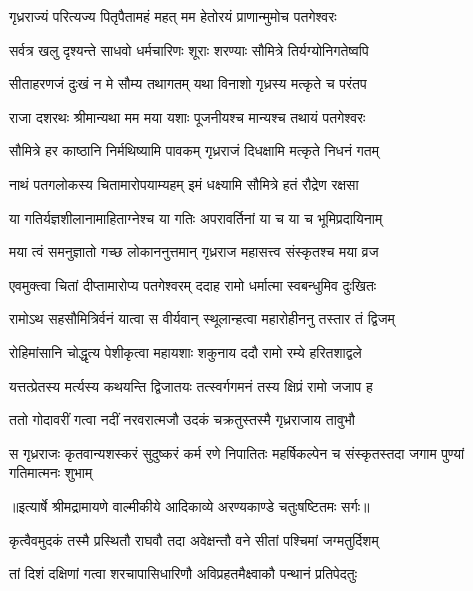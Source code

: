 \twolineshloka
{गृध्रराज्यं परित्यज्य पितृपैतामहं महत्}
{मम हेतोरयं प्राणान्मुमोच पतगेश्वरः} %

\twolineshloka
{सर्वत्र खलु दृश्यन्ते साधवो धर्मचारिणः}
{शूराः शरण्याः सौमित्रे तिर्यग्योनिगतेष्वपि} %

\twolineshloka
{सीताहरणजं दुःखं न मे सौम्य तथागतम्}
{यथा विनाशो गृध्रस्य मत्कृते च परंतप} %

\twolineshloka
{राजा दशरथः श्रीमान्यथा मम मया यशाः}
{पूजनीयश्च मान्यश्च तथायं पतगेश्वरः} %

\twolineshloka
{सौमित्रे हर काष्ठानि निर्मथिष्यामि पावकम्}
{गृध्रराजं दिधक्षामि मत्कृते निधनं गतम्} %

\twolineshloka
{नाथं पतगलोकस्य चितामारोपयाम्यहम्}
{इमं धक्ष्यामि सौमित्रे हतं रौद्रेण रक्षसा} %

\twolineshloka
{या गतिर्यज्ञशीलानामाहिताग्नेश्च या गतिः}
{अपरावर्तिनां या च या च भूमिप्रदायिनाम्} %

\twolineshloka
{मया त्वं समनुज्ञातो गच्छ लोकाननुत्तमान्}
{गृध्रराज महासत्त्व संस्कृतश्च मया व्रज} %

\twolineshloka
{एवमुक्त्वा चितां दीप्तामारोप्य पतगेश्वरम्}
{ददाह रामो धर्मात्मा स्वबन्धुमिव दुःखितः} %

\twolineshloka
{रामोऽथ सहसौमित्रिर्वनं यात्वा स वीर्यवान्}
{स्थूलान्हत्वा महारोहीननु तस्तार तं द्विजम्} %

\twolineshloka
{रोहिमांसानि चोद्धृत्य पेशीकृत्वा महायशाः}
{शकुनाय ददौ रामो रम्ये हरितशाद्वले} %

\twolineshloka
{यत्तत्प्रेतस्य मर्त्यस्य कथयन्ति द्विजातयः}
{तत्स्वर्गगमनं तस्य क्षिप्रं रामो जजाप ह} %

\twolineshloka
{ततो गोदावरीं गत्वा नदीं नरवरात्मजौ}
{उदकं चक्रतुस्तस्मै गृध्रराजाय तावुभौ} %

\fourlineindentedshloka
{स गृध्रराजः कृतवान्यशस्करं}
{ सुदुष्करं कर्म रणे निपातितः}
{महर्षिकल्पेन च संस्कृतस्तदा}
{ जगाम पुण्यां गतिमात्मनः शुभाम्} %


{॥इत्यार्षे श्रीमद्रामायणे वाल्मीकीये आदिकाव्ये अरण्यकाण्डे चतुःषष्टितमः सर्गः॥}


\twolineshloka
{कृत्वैवमुदकं तस्मै प्रस्थितौ राघवौ तदा}
{अवेक्षन्तौ वने सीतां पश्चिमां जग्मतुर्दिशम्} %

\twolineshloka
{तां दिशं दक्षिणां गत्वा शरचापासिधारिणौ}
{अविप्रहतमैक्ष्वाकौ पन्थानं प्रतिपेदतुः} %


